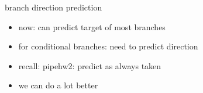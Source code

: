 \begin{frame}{branch direction prediction}
    \begin{itemize}
    \item now: can predict target of most branches
    \item for conditional branches: need to predict direction
    \vspace{.5cm}
    \item recall: pipehw2: predict as always taken
    \item we can do a lot better
    \end{itemize}
\end{frame}

